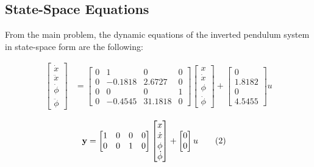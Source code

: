 \documentclass[11pt,twocolumn,twoside,lineno]{pnas-new}
\begin{document}
\subsection{State-Space Equations}

From the main problem, the dynamic equations of the inverted pendulum system in state-space form are the following:

\begin{align}
\begin{bmatrix}
  \dot{x} \\ \ddot{x} \\ \dot{\phi} \\ \ddot{\phi}
\end{bmatrix} &=
\begin{bmatrix}
  0 & 1 & 0 & 0 \\
  0 & -0.1818 & 2.6727 & 0 \\
  0 & 0 & 0 & 1 \\
  0 & -0.4545 & 31.1818 & 0
\end{bmatrix}
\begin{bmatrix}
  x \\ \dot{x} \\ \phi \\ \dot{\phi}
\end{bmatrix} +
\begin{bmatrix}
  0 \\ 1.8182 \\ 0 \\ 4.5455
\end{bmatrix}u \tag{1}
\end{align}

\begin{align}
{\bf y} &= \begin{bmatrix}
  1 & 0 & 0 & 0 \\
  0 & 0 & 1 & 0
\end{bmatrix}
\begin{bmatrix}
  x \\ \dot{x} \\ \phi \\ \dot{\phi}
\end{bmatrix} +
\begin{bmatrix}
  0 \\ 0
\end{bmatrix}u \tag{2}
\end{align}


\showmatmethods{} %


\showacknow{} %


\end{document}
